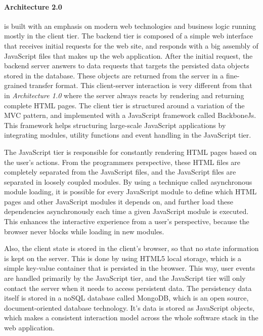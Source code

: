 \paragraph{Architecture 2.0} is built with an emphasis on modern web technologies and business logic running mostly in the client tier. The backend tier is composed of a simple web interface that receives initial requests for the web site, and responds with a big assembly of JavaScript files that makes up the web application. After the initial request, the backend server answers to data requests that targets the persisted data objects stored in the database. These objects are returned from the server in a fine-grained transfer format. This client-server interaction is very different from that in \textit{Architecture 1.0} where the server always reacts by rendering and returning complete HTML pages. 
The client tier is structured around a variation of the MVC pattern, and implemented with a JavaScript framework called BackboneJs. This framework helps structuring large-scale JavaScript applications by integrating modules, utility functions and event handling in the JavaScript tier. 

The JavaScript tier is responsible for constantly rendering HTML pages based on the user's actions. From the programmers perspective, these HTML files are completely separated from the JavaScript files, and the JavaScript files are separated in loosely coupled modules. By using a technique called asynchronous module loading, it is possible for every JavaScript module to define which HTML pages and other JavaScript modules it depends on, and further load these dependencies asynchronously each time a given JavaScript module is executed. This enhances the interactive experience from a user's perspective, because the browser never blocks while loading in new modules. 

Also, the client state is stored in the client's browser, so that no state information is kept on the server. This is done by using HTML5 local storage, which is a simple key-value container that is persisted in the browser. This way, user events are handled primarily by the JavaScript tier, and the JavaScript tier will only contact the server when it needs to access persistent data. The persistency data itself is stored in a noSQL database called MongoDB, which is an open source, document-oriented database technology. It's data is stored as JavaScript objects, which makes a consistent interaction model across the whole software stack in the web application. 



